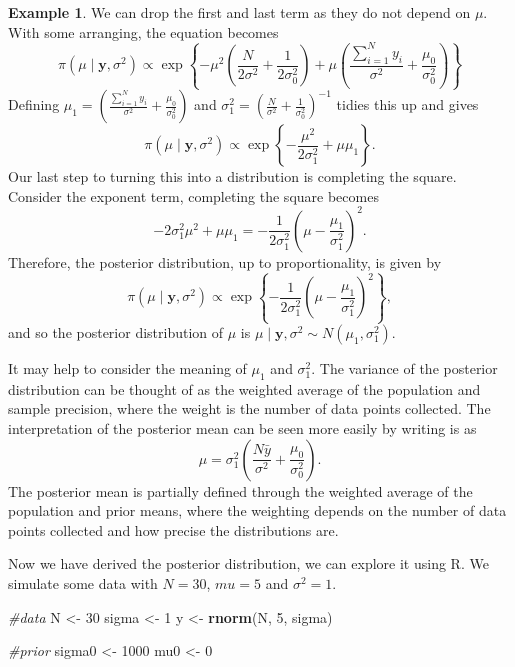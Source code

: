\documentclass[
]{book}
\newenvironment{Shaded}{\begin{snugshade}}{\end{snugshade}}
\newcommand{\CommentTok}[1]{\textcolor[rgb]{0.56,0.35,0.01}{\textit{#1}}}
\newcommand{\DecValTok}[1]{\textcolor[rgb]{0.00,0.00,0.81}{#1}}
\newcommand{\FunctionTok}[1]{\textcolor[rgb]{0.13,0.29,0.53}{\textbf{#1}}}
\newcommand{\NormalTok}[1]{#1}
\newcommand{\OtherTok}[1]{\textcolor[rgb]{0.56,0.35,0.01}{#1}}
\theoremstyle{definition}
\theoremstyle{definition}
\newtheorem{example}{Example}[chapter]
\theoremstyle{definition}
\theoremstyle{definition}
\theoremstyle{remark}
\begin{document}
\begin{example}
We can drop the first and last term as they do not depend on \(\mu\). With some arranging, the equation becomes
\[
\pi(\mu \mid \boldsymbol{y}, \sigma^2) \propto \exp\left\{-\mu^2\left(\frac{N}{2\sigma^2}  + \frac{1}{2\sigma_0^2}\right) + \mu\left(\frac{\sum_{i=1}^{N}y_i}{\sigma^2} + \frac{\mu_0}{\sigma_0^2} \right)  \right\}
\]
Defining \(\mu_1 =\left(\frac{\sum_{i=1}^{N}y_i}{\sigma^2} + \frac{\mu_0}{\sigma_0^2} \right)\) and \(\sigma^2_1 = \left(\frac{N}{\sigma^2} + \frac{1}{\sigma_0^2}\right)^{-1}\) tidies this up and gives
\[
\pi(\mu \mid \boldsymbol{y}, \sigma^2) \propto \exp\left\{-\frac{\mu^2}{2\sigma_1^2} + \mu\mu_1 \right\}.
\]
Our last step to turning this into a distribution is completing the square. Consider the exponent term, completing the square becomes
\[
-2\sigma_1^2\mu^2 + \mu\mu_1 = -\frac{1}{2\sigma^2_1}\left(\mu - \frac{\mu_1}{\sigma_1^2} \right)^2.
\]
Therefore, the posterior distribution, up to proportionality, is given by
\[
\pi(\mu \mid \boldsymbol{y}, \sigma^2) \propto \exp\left\{-\frac{1}{2\sigma^2_1}\left(\mu - \frac{\mu_1}{\sigma_1^2} \right)^2\right\},
\]
and so the posterior distribution of \(\mu\) is \(\mu \mid \boldsymbol{y}, \sigma^2 \sim N(\mu_1, \sigma^2_1)\).

It may help to consider the meaning of \(\mu_1\) and \(\sigma^2_1\). The variance of the posterior distribution can be thought of as the weighted average of the population and sample precision, where the weight is the number of data points collected. The interpretation of the posterior mean can be seen more easily by writing is as
\[
\mu  = \sigma_1^2\left(\frac{N\bar{y}}{\sigma^2} + \frac{\mu_0}{\sigma_0^2} \right).
\]
The posterior mean is partially defined through the weighted average of the population and prior means, where the weighting depends on the number of data points collected and how precise the distributions are.

Now we have derived the posterior distribution, we can explore it using R. We simulate some data with \(N = 30\), \(mu = 5\) and \(\sigma^2 = 1\).

\begin{Shaded}
\begin{Highlighting}[]
\CommentTok{\#data}
\NormalTok{N }\OtherTok{\textless{}{-}} \DecValTok{30}
\NormalTok{sigma }\OtherTok{\textless{}{-}} \DecValTok{1}
\NormalTok{y }\OtherTok{\textless{}{-}} \FunctionTok{rnorm}\NormalTok{(N, }\DecValTok{5}\NormalTok{, sigma)}

\CommentTok{\#prior}
\NormalTok{sigma0 }\OtherTok{\textless{}{-}} \DecValTok{1000}
\NormalTok{mu0     }\OtherTok{\textless{}{-}} \DecValTok{0}


\end{Highlighting}
\end{Shaded}
\end{example}
\end{document}
